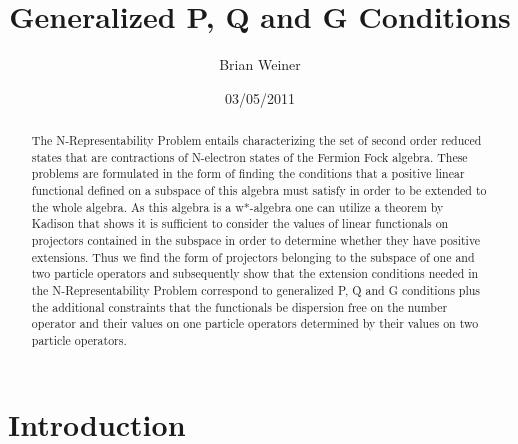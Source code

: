 \documentclass[aps,preprint]{revtex4}%
\begin{document}
\preprint{ }
\title[P, Q and G Conditions]{Generalized P, Q and G Conditions}
\author{Brian Weiner}

\begin{abstract}
The N-Representability Problem entails characterizing the set of second order
reduced states that are contractions of N-electron states of the Fermion Fock
algebra. These problems are formulated in the form of finding the conditions
that a positive linear functional defined on a subspace of this algebra must
satisfy in order to be extended to the whole algebra. As this algebra is a
w*-algebra one can utilize a theorem by Kadison that shows it is sufficient to
consider the values of linear functionals on projectors contained in the
subspace in order to determine whether they have positive extensions. Thus we
find the form of projectors belonging to the subspace of one and two particle
operators and subsequently show that the extension conditions needed in the
N-Representability Problem correspond to generalized P, Q and G conditions
plus the additional constraints that the functionals be dispersion free on the
number operator and their values on one particle operators determined by their
values on two particle operators.

\end{abstract}
\date{03/05/2011}
\maketitle
\tableofcontents


\section{Introduction \label{Intro}}
\end{document}
